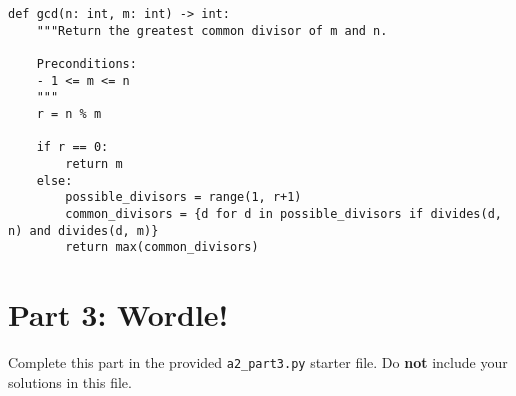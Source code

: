 \documentclass[11pt]{article}
\begin{document}
\begin{enumerate}
\begin{verbatim}
def gcd(n: int, m: int) -> int:
    """Return the greatest common divisor of m and n.

    Preconditions:
    - 1 <= m <= n
    """
    r = n % m

    if r == 0:
        return m 
    else:
        possible_divisors = range(1, r+1)
        common_divisors = {d for d in possible_divisors if divides(d, n) and divides(d, m)}
        return max(common_divisors)
\end{verbatim}
\end{enumerate}


\section*{Part 3: Wordle!}

Complete this part in the provided \texttt{a2\_part3.py} starter file.
Do \textbf{not} include your solutions in this file.
\end{document}
